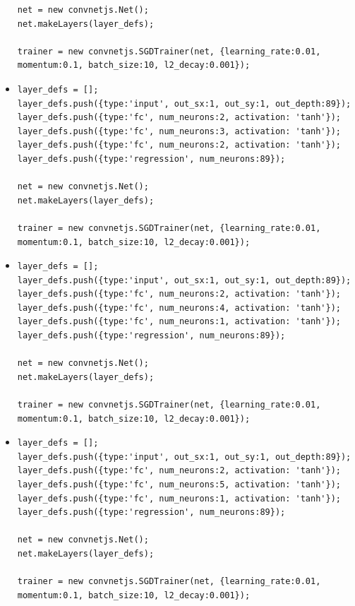 \begin{itemize}
\begin{verbatim}
net = new convnetjs.Net();
net.makeLayers(layer_defs);

trainer = new convnetjs.SGDTrainer(net, {learning_rate:0.01, 
momentum:0.1, batch_size:10, l2_decay:0.001});
\end{verbatim}


\item \begin{verbatim}
layer_defs = [];
layer_defs.push({type:'input', out_sx:1, out_sy:1, out_depth:89});
layer_defs.push({type:'fc', num_neurons:2, activation: 'tanh'});
layer_defs.push({type:'fc', num_neurons:3, activation: 'tanh'});
layer_defs.push({type:'fc', num_neurons:2, activation: 'tanh'});
layer_defs.push({type:'regression', num_neurons:89});

net = new convnetjs.Net();
net.makeLayers(layer_defs);

trainer = new convnetjs.SGDTrainer(net, {learning_rate:0.01, 
momentum:0.1, batch_size:10, l2_decay:0.001});
\end{verbatim}


\item \begin{verbatim}
layer_defs = [];
layer_defs.push({type:'input', out_sx:1, out_sy:1, out_depth:89});
layer_defs.push({type:'fc', num_neurons:2, activation: 'tanh'});
layer_defs.push({type:'fc', num_neurons:4, activation: 'tanh'});
layer_defs.push({type:'fc', num_neurons:1, activation: 'tanh'});
layer_defs.push({type:'regression', num_neurons:89});

net = new convnetjs.Net();
net.makeLayers(layer_defs);

trainer = new convnetjs.SGDTrainer(net, {learning_rate:0.01, 
momentum:0.1, batch_size:10, l2_decay:0.001});
\end{verbatim}

\item \begin{verbatim}
layer_defs = [];
layer_defs.push({type:'input', out_sx:1, out_sy:1, out_depth:89});
layer_defs.push({type:'fc', num_neurons:2, activation: 'tanh'});
layer_defs.push({type:'fc', num_neurons:5, activation: 'tanh'});
layer_defs.push({type:'fc', num_neurons:1, activation: 'tanh'});
layer_defs.push({type:'regression', num_neurons:89});

net = new convnetjs.Net();
net.makeLayers(layer_defs);

trainer = new convnetjs.SGDTrainer(net, {learning_rate:0.01,
momentum:0.1, batch_size:10, l2_decay:0.001});
\end{verbatim}



\end{itemize}
